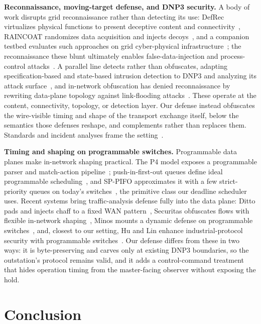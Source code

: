 \documentclass[conference]{IEEEtran}
\begin{document}
\noindent\textbf{Reconnaissance, moving-target defense, and DNP3 security.} A body of work disrupts
grid reconnaissance rather than detecting its use: DefRec virtualizes physical functions to present
deceptive content and connectivity~\cite{defrec2020}, RAINCOAT randomizes data acquisition and injects
decoys~\cite{raincoat2019}, and a companion testbed evaluates such approaches on grid cyber-physical
infrastructure~\cite{lintestbed2020}; the reconnaissance these blunt ultimately enables
false-data-injection and process-control attacks~\cite{liufdia2009,cardenas2011,sridhar2012}. A
parallel line detects rather than obfuscates, adapting specification-based and state-based intrusion
detection to DNP3 and analyzing its attack surface~\cite{linbro2013,fovino2010,east2009}, and in-network
obfuscation has denied reconnaissance by rewriting data-plane topology against link-flooding
attacks~\cite{nethide2018}. These operate at the content, connectivity, topology, or detection layer.
Our defense instead obfuscates the wire-visible timing and shape of the transport exchange itself,
below the semantics those defenses reshape, and complements rather than replaces them. Standards and
incident analyses frame the setting~\cite{dnp3std,ukraine2015,nist80082}.

\noindent\textbf{Timing and shaping on programmable switches.} Programmable data planes make in-network
shaping practical. The P4 model exposes a programmable parser and match-action
pipeline~\cite{p4ccr2014}; push-in-first-out queues define ideal programmable
scheduling~\cite{pifo2016}, and SP-PIFO approximates it with a few strict-priority queues on today's
switches~\cite{sppifo2020}, the primitive class our deadline scheduler uses. Recent systems bring
traffic-analysis defense fully into the data plane: Ditto pads and injects chaff to a fixed WAN
pattern~\cite{ditto2022}, Securitas obfuscates flows with flexible in-network
shaping~\cite{securitas2026}, Minos mounts a dynamic defense on programmable switches~\cite{minos2025},
and, closest to our setting, Hu and Lin enhance industrial-protocol security with programmable
switches~\cite{hulin2023}. Our defense differs from these in two ways: it is byte-preserving and carves
only at existing DNP3 boundaries, so the outstation's protocol remains valid, and it adds a
control-command treatment that hides operation timing from the master-facing observer without exposing
the hold.

\section{Conclusion}
\label{sec:concl}
\end{document}
